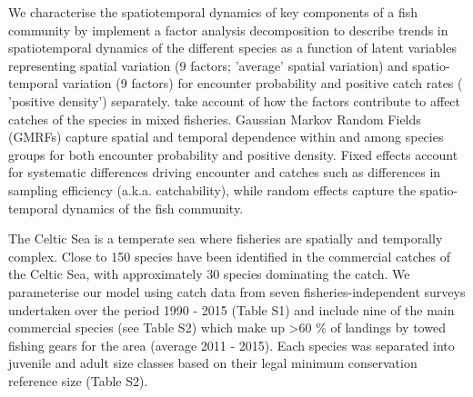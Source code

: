 \documentclass[12pt]{article}
\begin{document}
\begin{linenumbers}
 We 
characterise the spatiotemporal dynamics of key components of a fish community
by implement a factor analysis decomposition
to describe trends in spatiotemporal dynamics of the different species as a
function of latent variables\cite{Thorson2015} representing spatial variation
(9 factors; 'average' spatial variation) and
spatio-temporal variation (9 factors) for encounter probability and positive
catch rates ( 'positive density')
separately\cite{Thorson2015a}.   take account of how the factors contribute to affect
catches of the species in mixed fisheries. Gaussian Markov
Random Fields (GMRFs) capture spatial and temporal dependence
within and among species groups for both encounter probability and positive
density\cite{Thorson2013}. Fixed effects account for
systematic differences driving encounter and catches\deleted{,} such as
differences in sampling efficiency (a.k.a. catchability), while random effects
capture the spatio-temporal dynamics of the fish community.

 The Celtic Sea is a temperate sea where fisheries are spatially
and temporally complex\cite{Ellis2000, Gerritsen2012}.
Close to 150 species have been identified in the commercial catches of the
Celtic Sea, with approximately 30 species dominating the catch\cite{Mateo2016}.
We parameterise our model using catch data from seven
fisheries-independent surveys undertaken over the
period 1990 - 2015 (Table S1) and include nine of the main
commercial species (see Table S2)  which make up \textgreater 60 \% of landings by towed fishing
gears for the area (average 2011 - 2015\cite{STECF2017}). Each species was
separated into juvenile and adult size classes based on their legal minimum
conservation reference size (Table S2).


\end{linenumbers}
\end{document}
